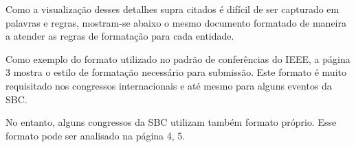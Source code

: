 Como a visualização desses detalhes supra citados é difícil de ser capturado em palavras e regras, mostram-se abaixo o mesmo documento formatado de maneira a atender as regras de formatação para cada entidade.

Como exemplo do formato utilizado no padrão de conferências do IEEE, a página 3 mostra o estilo de formatação necessário para submissão. Este formato é muito requisitado nos congressos internacionais e até mesmo para alguns eventos da SBC.

No entanto, alguns congressos da SBC utilizam também formato próprio. Esse formato pode ser analisado na página 4, 5.

\label{IEEE}
\label{SBC}